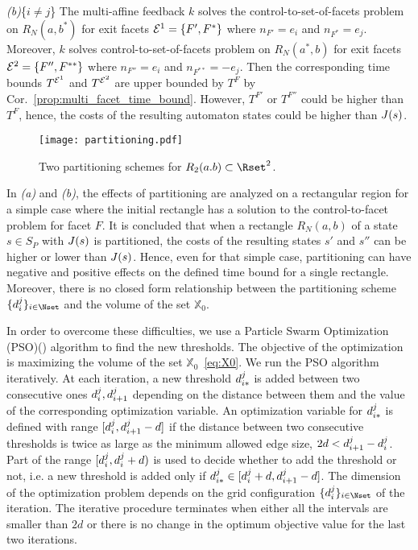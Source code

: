 \documentclass{ifacconf}
\newcommand{\RNab}{R_N(a,b)}
\newcommand{\XO}{\ensuremath{\mathbb{X}_0}}
\newcommand{\Fset}{{\cal E}}
\begin{document}
  
  \emph{(b)}\{{\it $i\neq j$}\} The multi-affine feedback $k$ solves the control-to-set-of-facets problem on $R_N(a,b^*)$ for exit facets $\Fset^1 = \{F' , F^*\}$ where $n_{F'} =  e_i$ and $n_{F^*} = e_j$. Moreover, $k$ solves control-to-set-of-facets problem on  $R_N(a^*,b)$ for exit facets $\Fset ^2= \{F'' , F^{**}\}$ where $n_{F''} =  e_i$ and $n_{F^{**}} = -e_j$. Then the corresponding time bounds $T^{\Fset^1}$ and  $T^{\Fset^2}$ are upper bounded by $T^F$ by Cor.~\ref{prop:multi_facet_time_bound}. However, $T^{F'}$ or $T^{F''}$ could be higher than $T^F$, hence, the costs of the resulting automaton states could be higher than $J(s)$.

\begin{figure}
\centering
\texttt{[image: partitioning.pdf]}
\caption{Two partitioning schemes for $R_2(a.b) \subset \Rset^2$.}
\label{fig:partition}
\end{figure}
In \emph{(a)} and \emph{(b)}, the effects of partitioning are analyzed on a rectangular region for a simple case where the initial rectangle has a solution to the control-to-facet problem for facet $F$. It is concluded that when a rectangle  $\RNab$ of a state $s \in S_{P}$ with $J(s)$  is partitioned, the costs of the resulting states $s'$ and $s''$ can be higher or lower than $J(s)$. 
Hence, even for that simple case, partitioning can have negative and positive effects on the defined time bound for a single rectangle.
Moreover, there is no closed form relationship between the partitioning scheme $\{d_i^j\}_{i \in \Nset}$  and the volume of the set $\XO$.


In order to overcome these difficulties,
we use a Particle Swarm Optimization (PSO)(\cite{PSOTralea}) algorithm to find the new thresholds. The objective of the optimization is maximizing the volume of the set $\XO$~\eqref{eq:X0}. We run the PSO algorithm iteratively.
At each iteration, a new threshold $d_{i*}^{j}$ is added between two consecutive ones $d_{i}^{j}, d_{i+1}^{j}$ depending on the distance between them and the value of the corresponding optimization variable. An optimization variable for $d_{i*}^{j}$ is defined with range $[d_{i}^{j}, d_{i+1}^{j} - d]$ if the distance between two consecutive thresholds is twice as large as the minimum allowed edge size, $2d < d_{i+1}^{j}- d_{i}^{j}$. Part of the range $[d_{i}^{j}, d_{i}^{j} + d)$ is used to decide whether to add the threshold or not, i.e. a new threshold is added only if $d_{i*}^{j} \in [d_{i}^{j} + d,d_{i+1}^{j}-d]$. 
The dimension of the optimization problem depends on the grid configuration $\{d_i^j\}_{i \in \Nset}$ of the iteration.
The iterative procedure terminates when either all the intervals are smaller than $2d$ or there is no change in the optimum objective value for the last two iterations. 
\end{document}
